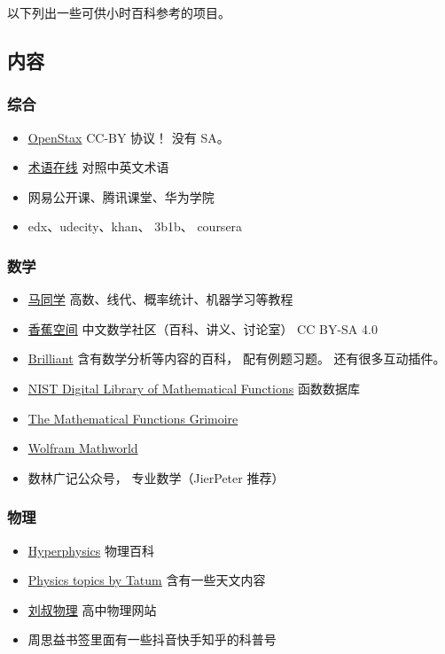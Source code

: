 
以下列出一些可供小时百科参考的项目。

\subsection{内容}
\subsubsection{综合}
\begin{itemize}
\item \href{https://openstax.org/}{OpenStax} CC-BY 协议！ 没有 SA。
\item \href{https://www.termonline.cn/index}{术语在线} 对照中英文术语
\item 网易公开课、腾讯课堂、华为学院
\item edx、udecity、khan、 3b1b、 coursera
\end{itemize}

\subsubsection{数学}
\begin{itemize}
\item \href{https://www.matongxue.com/}{马同学} 高数、线代、概率统计、机器学习等教程
\item \href{https://www.bananaspace.org/wiki/}{香蕉空间} 中文数学社区（百科、讲义、讨论室） CC BY-SA 4.0
\item \href{https://brilliant.org/}{Brilliant} 含有数学分析等内容的百科， 配有例题习题。 还有很多互动插件。
\item \href{https://dlmf.nist.gov/}{NIST Digital Library of Mathematical Functions} 函数数据库
\item \href{https://fungrim.org/}{The Mathematical Functions Grimoire}
\item \href{https://mathworld.wolfram.com/}{Wolfram Mathworld}
\item 数林广记公众号， 专业数学（JierPeter 推荐）
\end{itemize}

\subsubsection{物理}
\begin{itemize}
\item \href{http://hyperphysics.phy-astr.gsu.edu/}{Hyperphysics} 物理百科
\item \href{http://www.astro.uvic.ca/~tatum/index.php}{Physics topics by Tatum} 含有一些天文内容
\item \href{http://www.myliushu.com/}{刘叔物理} 高中物理网站
\item 周思益书签里面有一些抖音快手知乎的科普号
\end{itemize}

